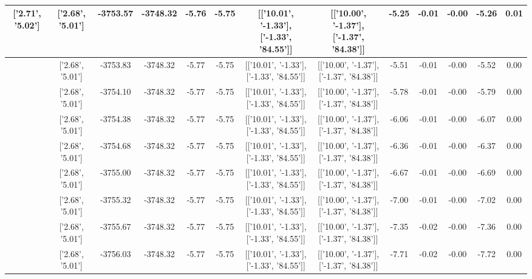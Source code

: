 \begin{table}[htbp]
\begin{adjustbox}{angle=90}
\begin{tabular}{|c|c|c|c|c|c|c|c|c|c|c|c|c|}
 ['2.71', '5.02'] & ['2.68', '5.01'] & -3753.57 & -3748.32 & -5.76 & -5.75 & [['10.01', '-1.33'], ['-1.33', '84.55']] & [['10.00', '-1.37'], ['-1.37', '84.38']] & -5.25 & -0.01 & -0.00 & -5.26 & 0.01\\ \hline
 ['2.71', '5.02'] & ['2.68', '5.01'] & -3753.83 & -3748.32 & -5.77 & -5.75 & [['10.01', '-1.33'], ['-1.33', '84.55']] & [['10.00', '-1.37'], ['-1.37', '84.38']] & -5.51 & -0.01 & -0.00 & -5.52 & 0.00\\ \hline
 ['2.71', '5.02'] & ['2.68', '5.01'] & -3754.10 & -3748.32 & -5.77 & -5.75 & [['10.01', '-1.33'], ['-1.33', '84.55']] & [['10.00', '-1.37'], ['-1.37', '84.38']] & -5.78 & -0.01 & -0.00 & -5.79 & 0.00\\ \hline
 ['2.71', '5.02'] & ['2.68', '5.01'] & -3754.38 & -3748.32 & -5.77 & -5.75 & [['10.01', '-1.33'], ['-1.33', '84.55']] & [['10.00', '-1.37'], ['-1.37', '84.38']] & -6.06 & -0.01 & -0.00 & -6.07 & 0.00\\ \hline
 ['2.71', '5.02'] & ['2.68', '5.01'] & -3754.68 & -3748.32 & -5.77 & -5.75 & [['10.01', '-1.33'], ['-1.33', '84.55']] & [['10.00', '-1.37'], ['-1.37', '84.38']] & -6.36 & -0.01 & -0.00 & -6.37 & 0.00\\ \hline
 ['2.71', '5.02'] & ['2.68', '5.01'] & -3755.00 & -3748.32 & -5.77 & -5.75 & [['10.01', '-1.33'], ['-1.33', '84.55']] & [['10.00', '-1.37'], ['-1.37', '84.38']] & -6.67 & -0.01 & -0.00 & -6.69 & 0.00\\ \hline
 ['2.71', '5.02'] & ['2.68', '5.01'] & -3755.32 & -3748.32 & -5.77 & -5.75 & [['10.01', '-1.33'], ['-1.33', '84.55']] & [['10.00', '-1.37'], ['-1.37', '84.38']] & -7.00 & -0.01 & -0.00 & -7.02 & 0.00\\ \hline
 ['2.71', '5.02'] & ['2.68', '5.01'] & -3755.67 & -3748.32 & -5.77 & -5.75 & [['10.01', '-1.33'], ['-1.33', '84.55']] & [['10.00', '-1.37'], ['-1.37', '84.38']] & -7.35 & -0.02 & -0.00 & -7.36 & 0.00\\ \hline
 ['2.72', '5.02'] & ['2.68', '5.01'] & -3756.03 & -3748.32 & -5.77 & -5.75 & [['10.01', '-1.33'], ['-1.33', '84.55']] & [['10.00', '-1.37'], ['-1.37', '84.38']] & -7.71 & -0.02 & -0.00 & -7.72 & 0.00\\ \hline
            \end{tabular}
        \end{adjustbox}
        \caption{}
        \label{}
    \end{table}
    